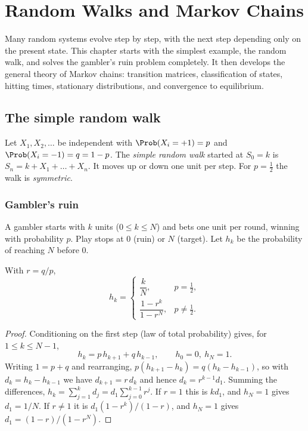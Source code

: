 \chapter{Random Walks and Markov Chains}
\label{ch:markov}

Many random systems evolve step by step, with the next step depending only on the
present state. This chapter starts with the simplest example, the random walk, and
solves the gambler's ruin problem completely. It then develops the general theory of
Markov chains: transition matrices, classification of states, hitting times, stationary
distributions, and convergence to equilibrium.

\section{The simple random walk}

Let $X_1,X_2,\dots$ be independent with $\Prob(X_i=+1)=p$ and $\Prob(X_i=-1)=q=1-p$.
The \emph{simple random walk} started at $S_0=k$ is $S_n=k+X_1+\dots+X_n$. It moves up or
down one unit per step. For $p=\tfrac12$ the walk is \emph{symmetric}.

\subsection{Gambler's ruin}

A gambler starts with $k$ units ($0\le k\le N$) and bets one unit per round, winning
with probability $p$. Play stops at $0$ (ruin) or $N$ (target). Let $h_k$ be the
probability of reaching $N$ before $0$.

\begin{theorem}\label{thm:ruin}
With $r=q/p$,
\[
h_k=\begin{cases}\dfrac kN,&p=\tfrac12,\\[1em]\dfrac{1-r^k}{1-r^N},&p\ne\tfrac12.\end{cases}
\]
\end{theorem}
\begin{proof}
Conditioning on the first step (law of total probability) gives, for $1\le k\le N-1$,
\[
h_k=p\,h_{k+1}+q\,h_{k-1},\qquad h_0=0,\ h_N=1 .
\]
Writing $1=p+q$ and rearranging, $p(h_{k+1}-h_k)=q(h_k-h_{k-1})$, so with
$d_k=h_k-h_{k-1}$ we have $d_{k+1}=r\,d_k$ and hence $d_k=r^{k-1}d_1$. Summing
the differences, $h_k=\sum_{j=1}^kd_j=d_1\sum_{j=0}^{k-1}r^j$. If $r=1$ this is
$kd_1$, and $h_N=1$ gives $d_1=1/N$. If $r\ne1$ it is $d_1(1-r^k)/(1-r)$, and
$h_N=1$ gives $d_1=(1-r)/(1-r^N)$.
\end{proof}

